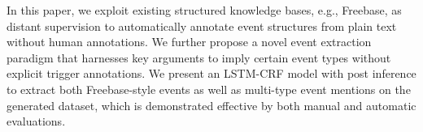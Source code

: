 In this paper, we exploit existing structured knowledge bases, e.g., Freebase, as distant supervision to automatically
annotate event structures from plain text without human annotations. We further propose a novel event extraction
paradigm that harnesses key arguments to imply certain event types without explicit trigger annotations. We present an
LSTM-CRF model with post inference to extract both Freebase-style events as well as multi-type event mentions on the
generated dataset, which is demonstrated effective by both manual and automatic evaluations.
